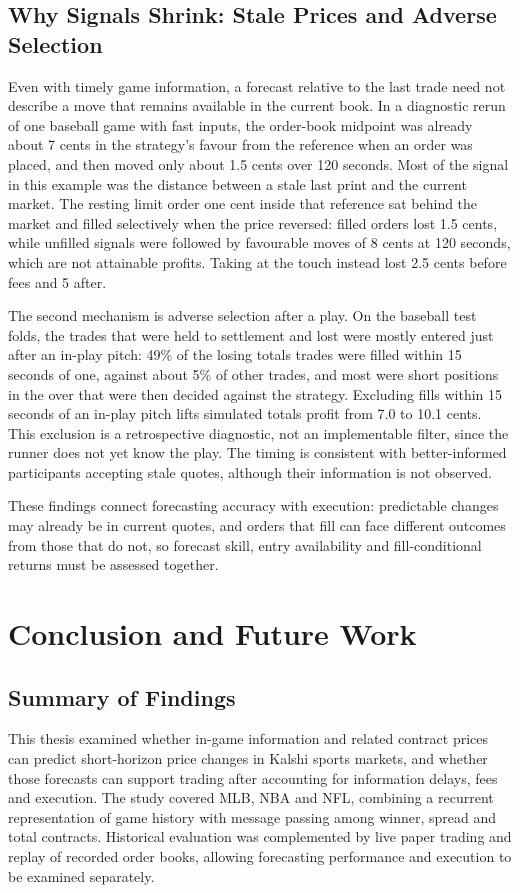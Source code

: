 \documentclass[12pt,a4paper,oneside]{report}
\begin{document}
\section{Why Signals Shrink: Stale Prices and Adverse Selection}\label{sec:stale}
Even with timely game information, a forecast relative to the last trade need
not describe a move that remains available in the current book. In a diagnostic
rerun of one baseball game with fast inputs, the order-book midpoint was already
about 7 cents in the strategy's favour from the reference when an order was
placed, and then moved only about 1.5 cents over 120 seconds. Most of the
signal in this example was the distance between a stale last print and the
current market. The resting limit order one cent inside that reference sat behind
the market and filled selectively when the price reversed: filled orders lost 1.5 cents,
while unfilled signals were followed by favourable moves of 8 cents at 120
seconds, which are not attainable profits.
Taking at the touch instead lost 2.5 cents before fees and 5 after.

The second mechanism is adverse selection after a play. On the baseball test
folds, the trades that were held to settlement and lost were mostly entered just
after an in-play pitch: 49\% of the losing totals trades were filled within 15
seconds of one, against about 5\% of other trades, and most were short positions
in the over that were then decided against the strategy. Excluding fills within
15 seconds of an in-play pitch lifts simulated totals profit from 7.0 to
10.1 cents. This exclusion is a retrospective diagnostic, not an implementable
filter, since the runner does not yet know the play. The timing is consistent
with better-informed participants accepting stale quotes, although their
information is not observed.

These findings connect forecasting accuracy with execution: predictable changes
may already be in current quotes, and orders that fill can face different
outcomes from those that do not, so forecast skill, entry availability and
fill-conditional returns must be assessed together.


\chapter{Conclusion and Future Work}
\label{ch:conclusion}
\section{Summary of Findings}
This thesis examined whether in-game information and related contract prices
can predict short-horizon price changes in Kalshi sports markets, and whether
those forecasts can support trading after accounting for information delays,
fees and execution. The study covered MLB, NBA and NFL, combining a recurrent
representation of game history with message passing among winner, spread and
total contracts. Historical evaluation was complemented by live paper trading
and replay of recorded order books, allowing forecasting performance and
execution to be examined separately.
\end{document}
